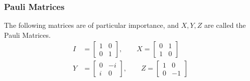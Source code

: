 \documentclass{beamer}
\begin{document}
    \begin{frame}
        \frametitle{Pauli Matrices}
        \begin{example}
            The following matrices are of particular importance, and $X, Y, Z$ are called the Pauli Matrices.
            \begin{align}
                \label{Pauli}
                I &= 
                \begin{bmatrix}
                    1 & 0 \\
                    0 & 1 
                \end{bmatrix}, \qquad 
                X = \begin{bmatrix}
                    0 & 1 \\
                    1 & 0 
                \end{bmatrix} \\
                Y &= 
                \begin{bmatrix}
                    0 & -i \\
                    i & 0 
                \end{bmatrix}, \qquad
                Z = \begin{bmatrix}
                    1 & 0 \\
                    0 & -1 
                \end{bmatrix}
            \end{align}
        \end{example}
    \end{frame}
\end{document}
